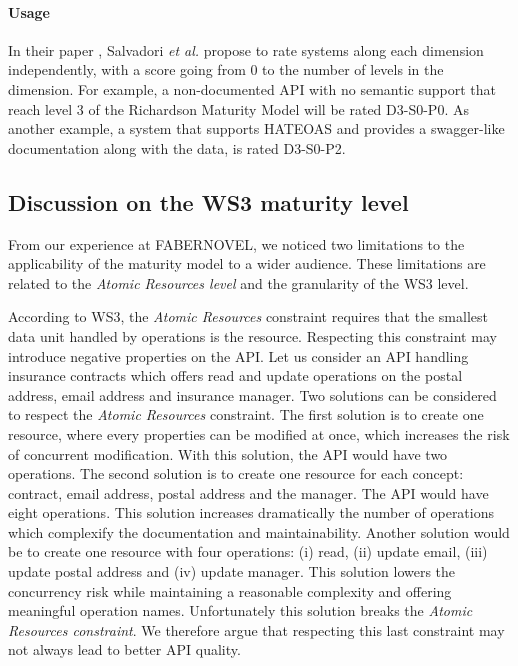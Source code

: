 \paragraph{Usage}
In their paper \cite{7195633}, Salvadori \emph{et al.} propose to rate systems along each dimension independently, with a score going from 0 to the number of levels in the dimension.
For example, a non-documented API with no semantic support that reach level 3 of the Richardson Maturity Model will be rated D3-S0-P0. As another example, a system that supports HATEOAS and provides a swagger-like documentation along with the data, is rated D3-S0-P2.

\subsection{Discussion on the WS3 maturity level} %

From our experience at FABERNOVEL, we noticed two limitations to the applicability of the maturity model to a wider audience. These limitations are related to the \textit{Atomic Resources level} and the granularity of the WS3 level.

According to WS3, the \textit{Atomic Resources} constraint requires that the smallest data unit handled by operations is the resource.
Respecting this constraint may introduce negative properties on the API.
Let us consider an API handling insurance contracts which offers read and update operations on the postal address, email address and insurance manager. 
Two solutions can be considered to respect the \textit{Atomic Resources} constraint. 
The first solution is to create one resource, where every properties can be modified at once, which increases the risk of concurrent modification. 
With this solution, the API would have two operations. 
The second solution is to create one resource for each concept: contract, email address, postal address and the manager. The API would have eight operations. This solution increases dramatically the number of operations which complexify the documentation and maintainability.
Another solution would be to create one resource with four operations: (i) read, (ii) update email, (iii) update postal address and (iv) update manager. 
This solution lowers the concurrency risk while maintaining a reasonable complexity and offering meaningful operation names. Unfortunately this solution breaks the \textit{Atomic Resources constraint}. We therefore argue that respecting this last constraint may not always lead to better API quality.

